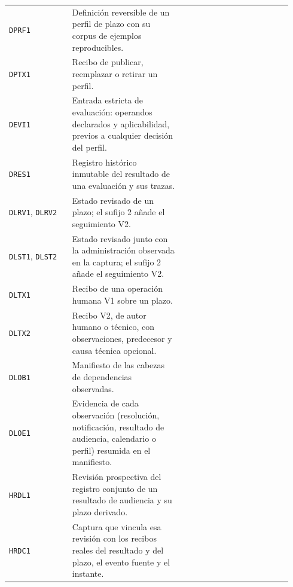 \begin{longtable}{@{}L{0.21\linewidth}L{0.37\linewidth}L{0.36\linewidth}@{}}
  \texttt{DPRF1} & Definición reversible de un perfil de plazo con su corpus de ejemplos reproducibles. &  \\
  \texttt{DPTX1} & Recibo de publicar, reemplazar o retirar un perfil. &  \\
  \texttt{DEVI1} & Entrada estricta de evaluación: operandos declarados y aplicabilidad, previos a cualquier decisión del perfil. &  \\
  \texttt{DRES1} & Registro histórico inmutable del resultado de una evaluación y sus trazas. &  \\
  \texttt{DLRV1}, \texttt{DLRV2} & Estado revisado de un plazo; el sufijo 2 añade el seguimiento V2. &  \\
  \texttt{DLST1}, \texttt{DLST2} & Estado revisado junto con la administración observada en la captura; el sufijo 2 añade el seguimiento V2. &  \\
  \texttt{DLTX1} & Recibo de una operación humana V1 sobre un plazo. &  \\
  \texttt{DLTX2} & Recibo V2, de autor humano o técnico, con observaciones, predecesor y causa técnica opcional. &  \\
  \texttt{DLOB1} & Manifiesto de las cabezas de dependencias observadas. &  \\
  \texttt{DLOE1} & Evidencia de cada observación (resolución, notificación, resultado de audiencia, calendario o perfil) resumida en el manifiesto. &  \\
  \texttt{HRDL1} & Revisión prospectiva del registro conjunto de un resultado de audiencia y su plazo derivado. &  \\
  \texttt{HRDC1} & Captura que vincula esa revisión con los recibos reales del resultado y del plazo, el evento fuente y el instante. &  \\

\end{longtable}
